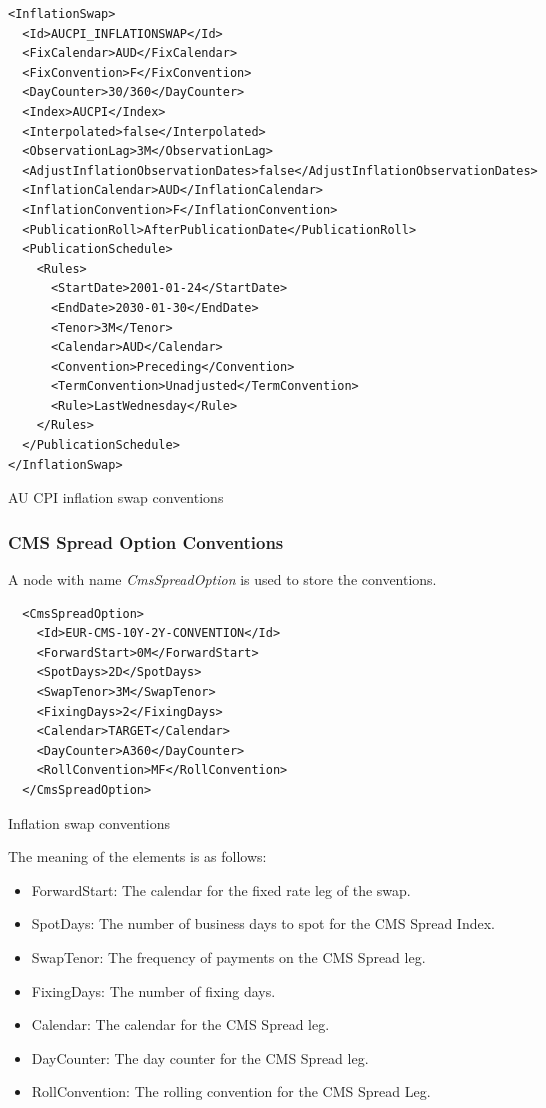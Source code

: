 \begin{listing}[H]
\begin{verbatim}
<InflationSwap>
  <Id>AUCPI_INFLATIONSWAP</Id>
  <FixCalendar>AUD</FixCalendar>
  <FixConvention>F</FixConvention>
  <DayCounter>30/360</DayCounter>
  <Index>AUCPI</Index>
  <Interpolated>false</Interpolated>
  <ObservationLag>3M</ObservationLag>
  <AdjustInflationObservationDates>false</AdjustInflationObservationDates>
  <InflationCalendar>AUD</InflationCalendar>
  <InflationConvention>F</InflationConvention>
  <PublicationRoll>AfterPublicationDate</PublicationRoll>
  <PublicationSchedule>
    <Rules>
      <StartDate>2001-01-24</StartDate>
      <EndDate>2030-01-30</EndDate>
      <Tenor>3M</Tenor>
      <Calendar>AUD</Calendar>
      <Convention>Preceding</Convention>
      <TermConvention>Unadjusted</TermConvention>
      <Rule>LastWednesday</Rule>
    </Rules>
  </PublicationSchedule>
</InflationSwap>
\end{verbatim}
\caption{AU CPI inflation swap conventions}
\label{lst:aucpi_inflation_conventions}
\end{listing}

\subsubsection{CMS Spread Option Conventions}

A node with name \emph{CmsSpreadOption} is used to store the conventions.

\begin{listing}[H]
\begin{verbatim}
  <CmsSpreadOption>
    <Id>EUR-CMS-10Y-2Y-CONVENTION</Id>
    <ForwardStart>0M</ForwardStart>
    <SpotDays>2D</SpotDays>
    <SwapTenor>3M</SwapTenor>
    <FixingDays>2</FixingDays>
    <Calendar>TARGET</Calendar>
    <DayCounter>A360</DayCounter>
    <RollConvention>MF</RollConvention>
  </CmsSpreadOption>
\end{verbatim}
\caption{Inflation swap conventions}
\label{lst:cms_spread_option_conventions}
\end{listing}

The meaning of the elements is as follows:

\begin{itemize}
\item ForwardStart: The calendar for the fixed rate leg of the swap.
\item SpotDays: The number of business days to spot for the CMS Spread Index.
\item SwapTenor: The frequency of payments on the CMS Spread leg.
\item FixingDays: The number of fixing days.
\item Calendar: The calendar for the CMS Spread leg.
\item DayCounter: The day counter for the CMS Spread leg.
\item RollConvention: The rolling convention for the CMS Spread Leg.
\end{itemize}

